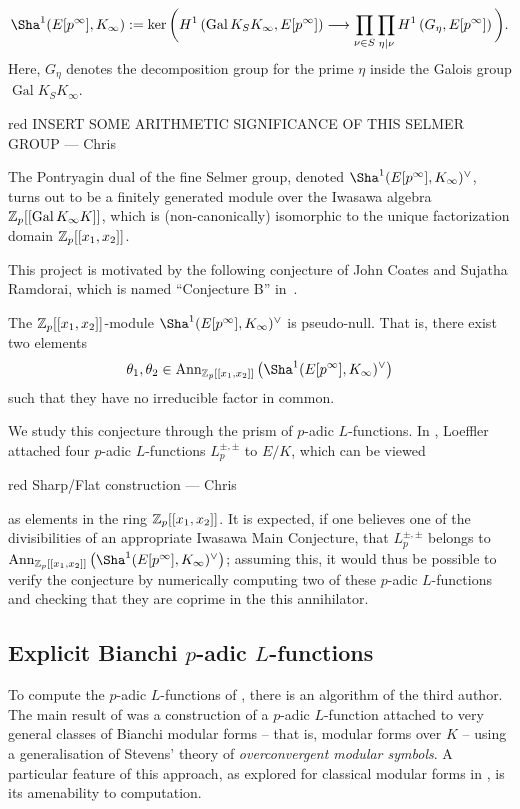 \documentclass[a4paper,10pt]{article}
\newcommand{\CWnote}[1]{
 \begin{color}{red}
 \marginpar{$\spadesuit$} #1
  --- Chris
 \end{color}
}
\newcommand{\CWnote}[1]{

}
\DeclareMathOperator{\Gal}{Gal}
\numberwithin{equation}{section}
\begin{document}
\begin{align*}
\Sha^1(E[p^\infty],K_\infty) := \ker\bigg(H^1\left(\Gal{K_S}{K_\infty},E[p^\infty]\right) \longrightarrow \prod_{\nu \in S} \prod_{\eta \mid \nu} H^1\left(G_\eta, E[p^\infty]\right) \bigg).
\end{align*}
Here, $G_\eta$ denotes the decomposition group for the prime $\eta$ inside the Galois group $\Gal{K_S}{K_\infty}$. 

\CWnote{INSERT SOME ARITHMETIC SIGNIFICANCE OF THIS SELMER GROUP}

The Pontryagin dual of the fine Selmer group, denoted $\Sha^1(E[p^\infty],K_\infty)^\vee$, turns out to be a finitely generated module over the Iwasawa algebra $\Z_p[[\Gal{K_\infty}{K}]]$, which is (non-canonically) isomorphic to the unique factorization domain $\mathbb{Z}_p[[x_1,x_2]]$.

This project is motivated by the following conjecture of John Coates and Sujatha Ramdorai, which is named ``Conjecture B'' in~\cite{MR2148798}.

\begin{conjecture*}\label{coates-sujatha-fine}
  The $\mathbb{Z}_p[[x_1,x_2]]$-module $\Sha^1(E[p^\infty],K_\infty)^\vee$ is pseudo-null. That is, there exist two elements
  \[
    \theta_1, \theta_2\in \mathrm{Ann}_{\Z_p[[x_1,x_2]]}\left(\Sha^1(E[p^\infty],K_\infty)^\vee\right)
  \]
  such that they have no irreducible factor in common.
\end{conjecture*}


We study this conjecture through the prism of $p$-adic $L$-functions. In \cite{Loe14}, Loeffler attached four $p$-adic $L$-functions $L_p^{\pm,\pm}$ to $E/K$, which can be viewed \CWnote{Sharp/Flat construction} as elements in the ring $\mathbb{Z}_p[[x_1,x_2]]$. It is expected, if one believes one of the divisibilities of an appropriate Iwasawa Main Conjecture, that $L_p^{\pm,\pm}$ belongs to $\mathrm{Ann}_{\Z_p[[x_1,x_2]]}\left(\Sha^1(E[p^\infty],K_\infty)^\vee\right)$; assuming this, it would thus be possible to verify the conjecture by numerically computing two of these $p$-adic $L$-functions and checking that they are coprime in the this annihilator. 

\subsection{Explicit Bianchi $p$-adic $L$-functions}
To compute the $p$-adic $L$-functions of \cite{Loe14}, there is an algorithm of the third author. The main result of \cite{Wil17} was a construction of a $p$-adic $L$-function attached to very general classes of Bianchi modular forms -- that is, modular forms over $K$ -- using a generalisation of Stevens' theory of \emph{overconvergent modular symbols}.  A particular feature of this approach, as explored for classical modular forms in \cite{PS11}, is its amenability to computation.
\end{document}
